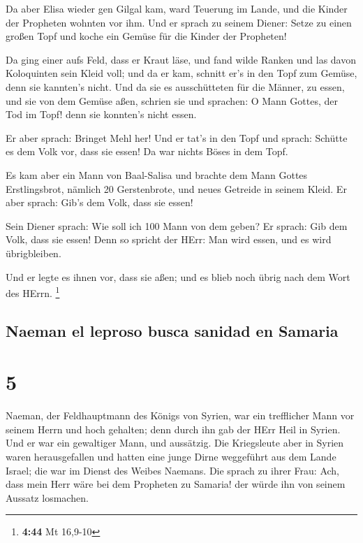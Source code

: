  Da aber Elisa wieder gen Gilgal kam, ward Teuerung im
Lande, und die Kinder der Propheten wohnten vor ihm. Und er sprach zu
seinem Diener: Setze zu einen großen Topf und koche ein Gemüse für die
Kinder der Propheten!

 Da ging einer aufs Feld, dass er Kraut läse, und fand
wilde Ranken und las davon Koloquinten sein Kleid voll; und da er kam,
schnitt er's in den Topf zum Gemüse, denn sie kannten's nicht.
 Und da sie es ausschütteten für die Männer, zu essen,
und sie von dem Gemüse aßen, schrien sie und sprachen: O Mann Gottes,
der Tod im Topf! denn sie konnten's nicht essen.

 Er aber sprach: Bringet Mehl her! Und er tat's in den
Topf und sprach: Schütte es dem Volk vor, dass sie essen! Da war nichts
Böses in dem Topf.

 Es kam aber ein Mann von Baal-Salisa und brachte dem
Mann Gottes Erstlingsbrot, nämlich 20 Gerstenbrote, und neues Getreide
in seinem Kleid. Er aber sprach: Gib's dem Volk, dass sie essen!

 Sein Diener sprach: Wie soll ich 100 Mann von dem geben?
Er sprach: Gib dem Volk, dass sie essen! Denn so spricht der HErr: Man
wird essen, und es wird übrigbleiben.

 Und er legte es ihnen vor, dass sie aßen; und es blieb
noch übrig nach dem Wort des HErrn. \footnote{\textbf{4:44} Mt 16,9-10}

\hypertarget{naeman-el-leproso-busca-sanidad-en-samaria}{%
\subsection{Naeman el leproso busca sanidad en
Samaria}\label{naeman-el-leproso-busca-sanidad-en-samaria}}

\hypertarget{section-4}{%
\section{5}\label{section-4}}

 Naeman, der Feldhauptmann des Königs von Syrien, war ein
trefflicher Mann vor seinem Herrn und hoch gehalten; denn durch ihn gab
der HErr Heil in Syrien. Und er war ein gewaltiger Mann, und aussätzig.
 Die Kriegsleute aber in Syrien waren herausgefallen und
hatten eine junge Dirne weggeführt aus dem Lande Israel; die war im
Dienst des Weibes Naemans.  Die sprach zu ihrer Frau: Ach,
dass mein Herr wäre bei dem Propheten zu Samaria! der würde ihn von
seinem Aussatz losmachen.

